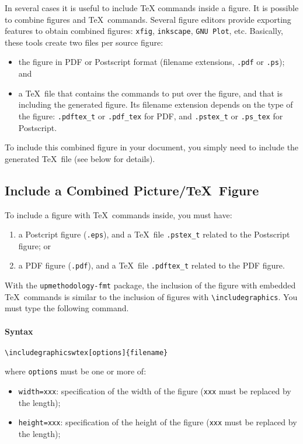 \documentclass[book,taskpackage,specpackage,codepackage]{upmethodology-document}
\begin{document}
In several cases it is useful to include \TeX\xspace commands inside a figure. It is possible to combine figures and \TeX\ commands. Several figure editors provide exporting features to obtain combined figures: \texttt{xfig}, \texttt{inkscape}, \texttt{GNU Plot}, etc. Basically, these tools create two files per source figure: \begin{itemize}
\item the figure in PDF or Postscript format (filename extensions, \texttt{.pdf} or \texttt{.ps}); and
\item a \TeX\ file that contains the commands to put over the figure, and that is including the generated figure. Its filename extension depends on the type of the figure: \texttt{.pdftex\_t} or \texttt{.pdf\_tex} for PDF, and \texttt{.pstex\_t} or \texttt{.ps\_tex} for Postscript.
\end{itemize}
To include this combined figure in your document, you simply need to include the generated \TeX\ file (see below for details).

\subsection{Include a Combined Picture/\TeX\ Figure}

To include a figure with \TeX\ commands inside, you must have: \begin{enumerate}
\item a Postcript figure (\texttt{.eps}), and a \TeX\ file \texttt{.pstex\_t} related to the Postscript figure; or
\item a PDF figure (\texttt{.pdf}), and a \TeX\ file \texttt{.pdftex\_t} related to the PDF figure.
\end{enumerate}

With the \texttt{upmethodology-fmt} package, the inclusion of the figure with embedded \TeX\ commands is similar to the inclusion of figures with \texttt{{\textbackslash}includegraphics}. You must type the following command.

\paragraph{Syntax} \texttt{{\textbackslash}includegraphicswtex[options]\{filename\}}

where \texttt{options} must be one or more of: \begin{itemize}
\item \texttt{width=xxx}: specification of the width of the figure (\texttt{xxx} must be replaced by the length);
\item \texttt{height=xxx}: specification of the height of the figure (\texttt{xxx} must be replaced by the length);
\end{itemize}
\end{document}
